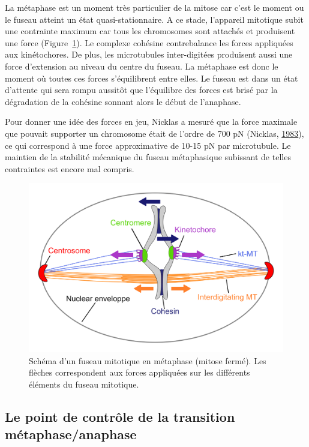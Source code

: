 \documentclass[12pt,a4paper,twoside,openright]{book}
\begin{document}
La métaphase est un moment très particulier de la mitose car c'est le
moment ou le fuseau atteint un état quasi-stationnaire. A ce stade,
l'appareil mitotique subit une contrainte maximum car tous les
chromosomes sont attachés et produisent une force
(Figure~\ref{fig:spindle}). Le complexe cohésine contrebalance les
forces appliquées aux kinétochores. De plus, les microtubules
inter-digitées produisent aussi une force d'extension au niveau du
centre du fuseau. La métaphase est donc le moment où toutes ces forces
s'équilibrent entre elles. Le fuseau est dans un état d'attente qui sera
rompu aussitôt que l'équilibre des forces est brisé par la dégradation
de la cohésine sonnant alors le début de l'anaphase.

Pour donner une idée des forces en jeu, Nicklas a mesuré que la force
maximale que pouvait supporter un chromosome était de l'ordre de 700 pN
(Nicklas, \hyperref[ref-Nicklas1983]{1983}), ce qui correspond à une
force approximative de 10-15 pN par microtubule. Le maintien de la
stabilité mécanique du fuseau métaphasique subissant de telles
contraintes est encore mal compris.

\begin{figure}[htbp]
\centering
\includegraphics{figures/intro/spindle.png}
\caption[Schéma d'un fuseau mitotique en métaphase]{\label{fig:spindle}Schéma
d'un fuseau mitotique en métaphase (mitose fermé). Les flèches
correspondent aux forces appliquées sur les différents éléments du
fuseau mitotique.}
\end{figure}

\subsection{Le point de contrôle de la transition
métaphase/anaphase}\label{le-point-de-contruxf4le-de-la-transition-muxe9taphaseanaphase}
\end{document}

